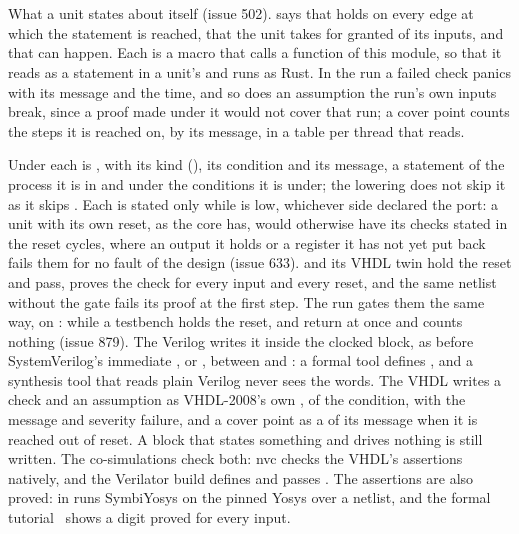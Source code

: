 \section{}
\label{sec:r-formal}

What a unit states about itself (issue 502). 
says that  holds on every edge at which the statement is
reached,  that the unit takes  for
granted of its inputs, and  that  can
happen. Each is a macro that calls a function of this module, so that
it reads as a statement in a unit's  and runs as Rust. In
the run a failed check panics with its message and the time, and so
does an assumption the run's own inputs break, since a proof made
under it would not cover that run; a cover point counts the steps it
is reached on, by its message, in a table per thread that
 reads.

Under \code{\#[lower]} each is , with its kind
(), its condition and its message, a statement of the
process it is in and under the conditions it is under; the lowering
does not skip it as it skips . Each is stated only
while  is low, whichever side declared the port: a unit with
its own reset, as the core has, would otherwise have its checks
stated in the reset cycles, where an output it holds or a register it
has not yet put back fails them for no fault of the design (issue
633).  and its VHDL twin
hold the reset and pass,  proves the check
for every input and every reset, and the same netlist without the gate
fails its proof at the first step. The run gates them the same way,
on : while a testbench holds the reset, 
and  return at once and  counts nothing
(issue 879). The Verilog writes it inside the clocked
block, as  before SystemVerilog's immediate
,  or
, between  and : a formal
tool defines , and a synthesis tool that reads plain
Verilog never sees the words. The VHDL writes a check and an
assumption as VHDL-2008's own , of 
the condition, with the message and severity failure, and a cover
point as a  of its message when it is reached out of
reset. A block that states something and drives nothing
is still written. The co-simulations check both: nvc checks the
VHDL's assertions natively, and the Verilator build defines
 and passes . The assertions are also
proved:  in  runs
SymbiYosys on the pinned Yosys over a netlist, and the formal
tutorial~\cite{prove} shows a digit proved for every input.


